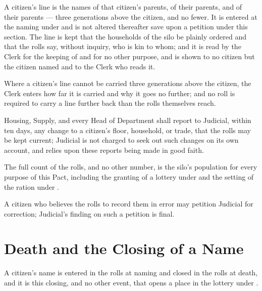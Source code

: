 \begin{clauses}
\item A citizen's line is the names of that citizen's parents, of their parents, and of their parents --- three generations above the citizen, and no fewer. It is entered at the naming under  and is not altered thereafter save upon a petition under this section. The line is kept that the households of the silo be plainly ordered and that the rolls say, without inquiry, who is kin to whom; and it is read by the Clerk for the keeping of  and for no other purpose, and is shown to no citizen but the citizen named and to the Clerk who reads it.
\item Where a citizen's line cannot be carried three generations above the citizen, the Clerk enters how far it is carried and why it goes no further; and no roll is required to carry a line further back than the rolls themselves reach.
\item Housing, Supply, and every Head of Department shall report to Judicial, within ten days, any change to a citizen's floor, household, or trade, that the rolls may be kept current; Judicial is not charged to seek out such changes on its own account, and relies upon these reports being made in good faith.
\item The full count of the rolls, and no other number, is the silo's population for every purpose of this Pact, including the granting of a lottery under  and the setting of the ration under .
\item A citizen who believes the rolls to record them in error may petition Judicial for correction; Judicial's finding on such a petition is final.
\end{clauses}

\section{Death and the Closing of a Name}
\label{sec:citizenship:death-and-the-closing-of-a-name}

A citizen's name is entered in the rolls at naming and closed in the rolls at death, and it is this closing, and no other event, that opens a place in the lottery under .

